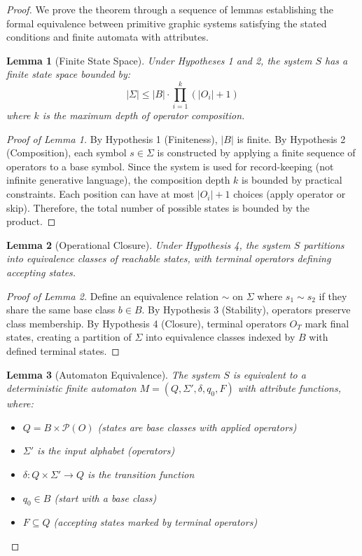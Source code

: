\documentclass[12pt,a4paper]{article}
\newtheorem{lemma}{Lemma}
\begin{document}
\begin{proof}
We prove the theorem through a sequence of lemmas establishing the formal equivalence between primitive graphic systems satisfying the stated conditions and finite automata with attributes.

\begin{lemma}[Finite State Space]
Under Hypotheses 1 and 2, the system $S$ has a finite state space bounded by:
\[
|\Sigma| \leq |B| \cdot \prod_{i=1}^{k} (|O_i| + 1)
\]
where $k$ is the maximum depth of operator composition.
\end{lemma}

\begin{proof}[Proof of Lemma 1]
By Hypothesis 1 (Finiteness), $|B|$ is finite. By Hypothesis 2 (Composition), each symbol $s \in \Sigma$ is constructed by applying a finite sequence of operators to a base symbol. Since the system is used for record-keeping (not infinite generative language), the composition depth $k$ is bounded by practical constraints. Each position can have at most $|O_i| + 1$ choices (apply operator or skip). Therefore, the total number of possible states is bounded by the product.
\end{proof}

\begin{lemma}[Operational Closure]
Under Hypothesis 4, the system $S$ partitions into equivalence classes of reachable states, with terminal operators defining accepting states.
\end{lemma}

\begin{proof}[Proof of Lemma 2]
Define an equivalence relation $\sim$ on $\Sigma$ where $s_1 \sim s_2$ if they share the same base class $b \in B$. By Hypothesis 3 (Stability), operators preserve class membership. By Hypothesis 4 (Closure), terminal operators $O_T$ mark final states, creating a partition of $\Sigma$ into equivalence classes indexed by $B$ with defined terminal states.
\end{proof}

\begin{lemma}[Automaton Equivalence]
The system $S$ is equivalent to a deterministic finite automaton $M = (Q, \Sigma', \delta, q_0, F)$ with attribute functions, where:
\begin{itemize}
    \item $Q = B \times \mathcal{P}(O)$ (states are base classes with applied operators)
    \item $\Sigma'$ is the input alphabet (operators)
    \item $\delta: Q \times \Sigma' \to Q$ is the transition function
    \item $q_0 \in B$ (start with a base class)
    \item $F \subseteq Q$ (accepting states marked by terminal operators)
\end{itemize}
\end{lemma}


\end{proof}
\end{document}
